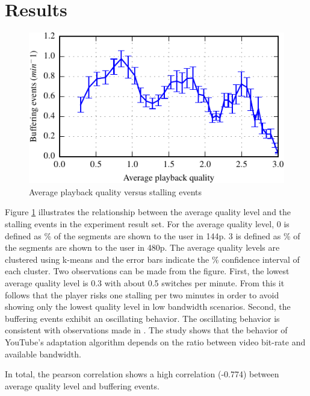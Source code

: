 
\section{Results}
\label{sec:results}

\begin{figure}[t]
\centering
\includegraphics[width=0.95\linewidth]{figs/33qualityvstalling}%
\caption{Average playback quality versus stalling events}
\label{fig:qualityvsstalling}%
\end{figure}

Figure \ref{fig:qualityvsstalling} illustrates the relationship between the average quality level and the stalling events in the experiment result set.
For the average quality level, 0 is defined as \unit[100]{\%} of the segments are shown to the user in 144p. 3 is defined as \unit[100]{\%} of the segments are shown to the user in 480p.
The average quality levels are clustered using k-means and the error bars indicate the \unit[95]{\%} confidence interval of each cluster.
Two observations can be made from the figure. 
First, the lowest average quality level is 0.3 with about 0.5 switches per minute.
From this it follows that the player risks one stalling per two minutes in order to avoid showing only the lowest quality level in low bandwidth scenarios.
Second, the buffering events exhibit an oscillating behavior.
The oscillating behavior is consistent with observations made in \cite{sieber16sacrificing}.
The study shows that the behavior of YouTube's adaptation algorithm depends on the ratio between video bit-rate and available bandwidth.

In total, the pearson correlation shows a high correlation (-0.774) between average quality level and buffering events.

